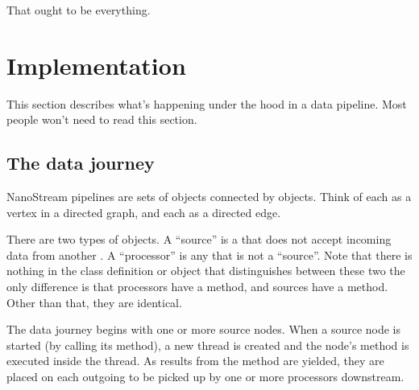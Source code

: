 \documentclass[letterpaper,10pt,english]{sphinxmanual}
\begin{document}

That ought to be everything.


\chapter{Implementation}
\label{\detokenize{implementation:implementation}}\label{\detokenize{implementation::doc}}
This section describes what’s happening under the hood in a 
data pipeline. Most people won’t need to read this section.


\section{The data journey}
\label{\detokenize{implementation:the-data-journey}}
NanoStream pipelines are sets of  objects connected by 
objects. Think of each  as a vertex in a directed graph, and each
 as a directed edge.

There are two types of  objects. A “source” is a  that does not accept incoming data from another . A “processor” is any  that is not a “source”. Note that there is nothing in the class definition or object that distinguishes between these two \textendash{} the only
difference is that processors have a  method, and sources have a  method. Other than that, they are identical.

The data journey begins with one or more source nodes. When a source node is started (by calling its  method), a new thread is created and the node’s  method is executed inside the thread. As results from the  method are yielded, they are placed on each outgoing  to be picked up by one or more processors downstream.
\end{document}
